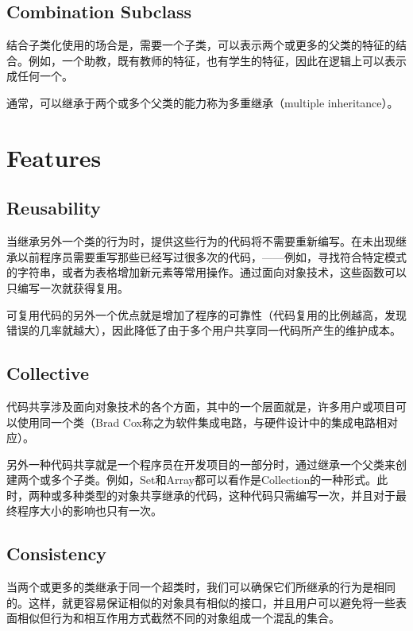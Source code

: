 \section{Combination Subclass}

结合子类化使用的场合是，需要一个子类，可以表示两个或更多的父类的特征的结合。例如，一个助教，既有教师的特征，也有学生的特征，因此在逻辑上可以表示成任何一个。

通常，可以继承于两个或多个父类的能力称为多重继承（multiple inheritance）。

\chapter{Features}

\section{Reusability}


当继承另外一个类的行为时，提供这些行为的代码将不需要重新编写。在未出现继承以前程序员需要重写那些已经写过很多次的代码，——例如，寻找符合特定模式的字符串，或者为表格增加新元素等常用操作。通过面向对象技术，这些函数可以只编写一次就获得复用。

可复用代码的另外一个优点就是增加了程序的可靠性（代码复用的比例越高，发现错误的几率就越大），因此降低了由于多个用户共享同一代码所产生的维护成本。

\section{Collective}

代码共享涉及面向对象技术的各个方面，其中的一个层面就是，许多用户或项目可以使用同一个类（Brad Cox称之为软件集成电路，与硬件设计中的集成电路相对应）。

另外一种代码共享就是一个程序员在开发项目的一部分时，通过继承一个父类来创建两个或多个子类。例如，Set和Array都可以看作是Collection的一种形式。此时，两种或多种类型的对象共享继承的代码，这种代码只需编写一次，并且对于最终程序大小的影响也只有一次。


\section{Consistency}

当两个或更多的类继承于同一个超类时，我们可以确保它们所继承的行为是相同的。这样，就更容易保证相似的对象具有相似的接口，并且用户可以避免将一些表面相似但行为和相互作用方式截然不同的对象组成一个混乱的集合。


